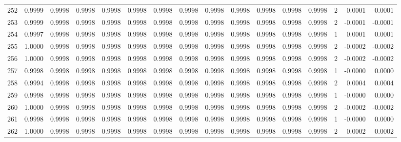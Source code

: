 \begin{tabular}{lrrrrrrrrrrrrrrr}
252 &      0.9999 &  0.9998 &  0.9998 &  0.9998 &  0.9998 &  0.9998 &  0.9998 &  0.9998 &  0.9998 &  0.9998 &   0.9998 &     0.9998 &      2 &                   -0.0001 &                    -0.0001 \\
253 &      0.9999 &  0.9998 &  0.9998 &  0.9998 &  0.9998 &  0.9998 &  0.9998 &  0.9998 &  0.9998 &  0.9998 &   0.9998 &     0.9998 &      2 &                   -0.0001 &                    -0.0001 \\
254 &      0.9997 &  0.9998 &  0.9998 &  0.9998 &  0.9998 &  0.9998 &  0.9998 &  0.9998 &  0.9998 &  0.9998 &   0.9998 &     0.9998 &      1 &                    0.0001 &                     0.0001 \\
255 &      1.0000 &  0.9998 &  0.9998 &  0.9998 &  0.9998 &  0.9998 &  0.9998 &  0.9998 &  0.9998 &  0.9998 &   0.9998 &     0.9998 &      2 &                   -0.0002 &                    -0.0002 \\
256 &      1.0000 &  0.9998 &  0.9998 &  0.9998 &  0.9998 &  0.9998 &  0.9998 &  0.9998 &  0.9998 &  0.9998 &   0.9998 &     0.9998 &      2 &                   -0.0002 &                    -0.0002 \\
257 &      0.9998 &  0.9998 &  0.9998 &  0.9998 &  0.9998 &  0.9998 &  0.9998 &  0.9998 &  0.9998 &  0.9998 &   0.9998 &     0.9998 &      1 &                   -0.0000 &                     0.0000 \\
258 &      0.9994 &  0.9998 &  0.9998 &  0.9998 &  0.9998 &  0.9998 &  0.9998 &  0.9998 &  0.9998 &  0.9998 &   0.9998 &     0.9998 &      2 &                    0.0004 &                     0.0004 \\
259 &      0.9998 &  0.9998 &  0.9998 &  0.9998 &  0.9998 &  0.9998 &  0.9998 &  0.9998 &  0.9998 &  0.9998 &   0.9998 &     0.9998 &      1 &                   -0.0000 &                     0.0000 \\
260 &      1.0000 &  0.9998 &  0.9998 &  0.9998 &  0.9998 &  0.9998 &  0.9998 &  0.9998 &  0.9998 &  0.9998 &   0.9998 &     0.9998 &      2 &                   -0.0002 &                    -0.0002 \\
261 &      0.9998 &  0.9998 &  0.9998 &  0.9998 &  0.9998 &  0.9998 &  0.9998 &  0.9998 &  0.9998 &  0.9998 &   0.9998 &     0.9998 &      1 &                   -0.0000 &                     0.0000 \\
262 &      1.0000 &  0.9998 &  0.9998 &  0.9998 &  0.9998 &  0.9998 &  0.9998 &  0.9998 &  0.9998 &  0.9998 &   0.9998 &     0.9998 &      2 &                   -0.0002 &                    -0.0002 \\

\end{tabular}

